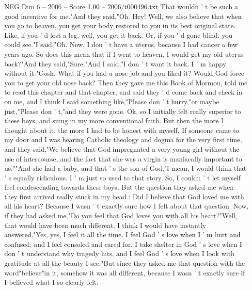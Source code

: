 \begin{textsample}{NEG Dim 6 – 2006 – Score 1.00 – 2006/t000496.txt}
That wouldn ' t be such a good incentive for me."And they said,"Oh.
Hey!
Well, we also believe that when you go to heaven, you get your body restored to you in its best original state.
Like, if you ' d lost a leg, well, you get it back.
Or, if you ' d gone blind, you could see."I said,"Oh.
Now, I don ' t have a uterus, because I had cancer a few years ago.
So does this mean that if I went to heaven, I would get my old uterus back?"And they said,"Sure."And I said,"I don ' t want it back.
I ' m happy without it."Gosh.
What if you had a nose job and you liked it?
Would God force you to get your old nose back?
Then they gave me this Book of Mormon, told me to read this chapter and that chapter, and said they ' d come back and check in on me, and I think I said something like,"Please don ' t hurry,"or maybe just,"Please don ' t,"and they were gone.
Ok, so I initially felt really superior to these boys, and smug in my more conventional faith.
But then the more I thought about it, the more I had to be honest with myself.
If someone came to my door and I was hearing Catholic theology and dogma for the very first time, and they said,"We believe that God impregnated a very young girl without the use of intercourse, and the fact that she was a virgin is maniacally important to us.""And she had a baby, and that ' s the son of God,"I mean, I would think that ' s equally ridiculous.
I ' m just so used to that story.
So, I couldn ' t let myself feel condescending towards these boys.
But the question they asked me when they first arrived really stuck in my head : Did I believe that God loved me with all his heart?
Because I wasn ' t exactly sure how I felt about that question.
Now, if they had asked me,"Do you feel that God loves you with all his heart?"Well, that would have been much different, I think I would have instantly answered,"Yes, yes, I feel it all the time.
I feel God ' s love when I ' m hurt and confused, and I feel consoled and cared for.
I take shelter in God ' s love when I don ' t understand why tragedy hits, and I feel God ' s love when I look with gratitude at all the beauty I see."But since they asked me that question with the word"believe"in it, somehow it was all different, because I wasn ' t exactly sure if I believed what I so clearly felt.

\end{textsample}
